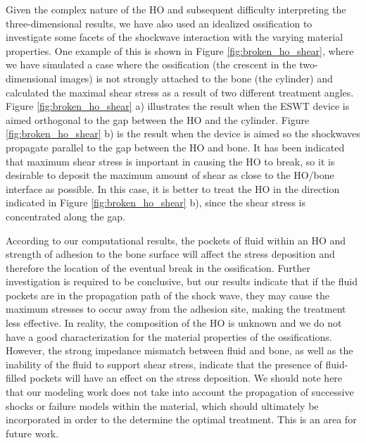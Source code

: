 \documentclass{article}
\begin{document}
Given the complex nature of the HO and subsequent difficulty interpreting the three-dimensional results, we have also used an idealized ossification to investigate some facets of the shockwave interaction with the varying material properties.  One example of this is shown in Figure \ref{fig:broken_ho_shear}, where we have simulated a case where the ossification (the crescent in the two-dimensional images) is not strongly attached to the bone (the cylinder) and calculated the maximal shear stress as a result of two different treatment angles.  Figure \ref{fig:broken_ho_shear} a) illustrates the result when the ESWT device is aimed orthogonal to the gap between the HO and the cylinder.   Figure \ref{fig:broken_ho_shear} b) is the result when the device is aimed so the shockwaves propagate parallel to the gap between the HO and bone.  It has been indicated that maximum shear stress is important in causing the HO to break, so it is desirable to deposit the maximum amount of shear as close to the HO/bone interface as possible.  In this case, it is better to treat the HO in the direction indicated in Figure \ref{fig:broken_ho_shear} b), since the shear stress is concentrated along the gap.  

According to our computational results, the pockets of fluid within an HO and strength of adhesion to the bone surface will affect the stress deposition and therefore the location of the eventual break in the ossification.  Further investigation is required to be conclusive, but our results indicate that if the fluid pockets are in the propagation path of the shock wave, they may cause the maximum stresses to occur away from the adhesion site, making the treatment less effective.  In reality, the composition of the HO is unknown and we do not have a good characterization for the material properties of the ossifications.  However, the strong impedance mismatch between fluid and bone, as well as the inability of the fluid to support shear stress, indicate that the presence of fluid-filled pockets will have an effect on the stress deposition.   
We should note here that our modeling work does not take into account the propagation of successive shocks or failure models within the material, which should ultimately be incorporated in order to  the determine the optimal treatment.  This is an area for future work.
\end{document}
